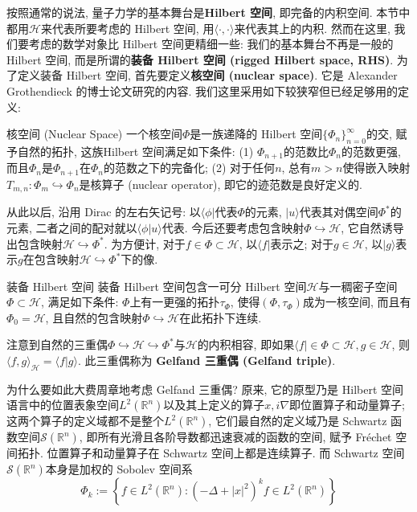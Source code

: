 
     按照通常的说法, 量子力学的基本舞台是\textbf{Hilbert 空间}, 即完备的内积空间. 本节中都用$\mathcal{H}$来代表所要考虑的 Hilbert 空间, 用$\langle\cdot,\cdot\rangle$来代表其上的内积. 然而在这里, 我们要考虑的数学对象比 Hilbert 空间更精细一些: 我们的基本舞台不再是一般的 Hilbert 空间, 而是所谓的\textbf{装备 Hilbert 空间 (rigged Hilbert space, RHS)}. 为了定义装备 Hilbert 空间, 首先要定义\textbf{核空间 (nuclear space)}. 它是 Alexander Grothendieck 的博士论文研究的内容. 我们这里采用如下较狭窄但已经足够用的定义:

\begin{definition}{核空间 (Nuclear Space)}
一个核空间$\Phi$是一族递降的 Hilbert 空间$\{\Phi_n\}_{n=0}^∞$的交, 赋予自然的拓扑, 这族Hilbert 空间满足如下条件: (1) $\Phi_{n+1}$的范数比$\Phi_n$的范数更强, 而且$\Phi_n$是$\Phi_{n+1}$在$\Phi_n$的范数之下的完备化; (2) 对于任何$n$, 总有$m>n$使得嵌入映射$T_{m,n}:\Phi_{m}\hookrightarrow \Phi_n$是核算子 (nuclear operator), 即它的迹范数是良好定义的.
\end{definition}

      从此以后, 沿用 Dirac 的左右矢记号: 以$\langle\phi|$代表$\Phi$的元素, $|u\rangle$代表其对偶空间$\Phi^*$的元素, 二者之间的配对就以$\langle\phi|u\rangle$代表. 今后还要考虑包含映射$\Phi\hookrightarrow\mathcal{H}$, 它自然诱导出包含映射$\mathcal{H}\hookrightarrow\Phi^*$. 为方便计, 对于$f\in\Phi\subset\mathcal{H}$, 以$\langle f|$表示之; 对于$g\in\mathcal{H}$, 以$|g\rangle$表示$g$在包含映射$\mathcal{H}\hookrightarrow\Phi^*$下的像.

      

\begin{definition}{装备 Hilbert 空间}
装备 Hilbert 空间包含一可分 Hilbert 空间$\mathcal{H}$与一稠密子空间$\Phi\subset\mathcal{H}$, 满足如下条件: $\Phi$上有一更强的拓扑$\tau_Φ$, 使得$(Φ,\tau_Φ)$成为一核空间, 而且有$Φ_0=\mathcal{H}$, 且自然的包含映射$Φ\hookrightarrow\mathcal{H}$在此拓扑下连续.
\end{definition}

    注意到自然的三重偶$\Phi\hookrightarrow\mathcal{H}\hookrightarrow\Phi^*$与$\mathcal{H}$的内积相容, 即如果$\langle f|\in\Phi\subset\mathcal{H},g\in\mathcal{H}$, 则$\langle f,g\rangle_{\mathcal{H}}=\langle f|g\rangle$. 此三重偶称为 \textbf{Gelfand 三重偶 (Gelfand triple)}.

    为什么要如此大费周章地考虑 Gelfand 三重偶? 原来, 它的原型乃是 Hilbert 空间语言中的位置表象空间$L^2(\mathbb{R}^n)$以及其上定义的算子$x,i\nabla$即位置算子和动量算子; 这两个算子的定义域都不是整个$L^2(\mathbb{R}^n)$, 它们最自然的定义域乃是 Schwartz 函数空间$\mathcal{S}(\mathbb{R}^n)$, 即所有光滑且各阶导数都迅速衰减的函数的空间, 赋予 Fréchet 空间拓扑. 位置算子和动量算子在 Schwartz 空间上都是连续算子. 而 Schwartz 空间$\mathcal{S}(\mathbb{R}^n)$本身是加权的 Sobolev 空间系
$$\Phi_k := \left\{f \in L^2 (\mathbb{R}^n): (-\Delta + |x|^ 2)^{k} f \in L^2 (\mathbb{R}^n) \right\}$$

